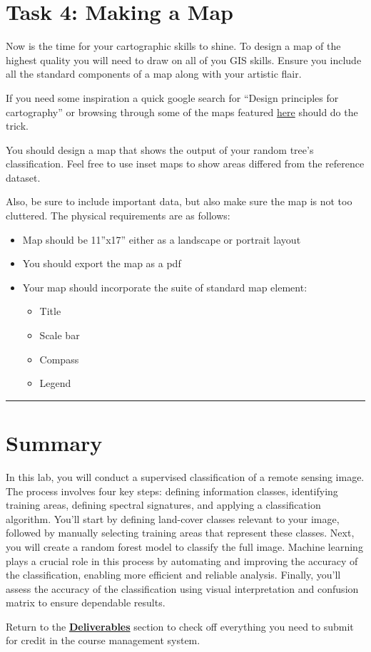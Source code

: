 \documentclass[
]{book}
\begin{document}
\hypertarget{task-4-making-a-map}{%
\section*{Task 4: Making a Map}\label{task-4-making-a-map}}

Now is the time for your cartographic skills to shine. To design a map of the highest quality you will need to draw on all of you GIS skills. Ensure you include all the standard components of a map along with your artistic flair.

If you need some inspiration a quick google search for ``Design principles for cartography'' or browsing through some of the maps featured \href{https://livingatlas.arcgis.com/en/home/}{here} should do the trick.

You should design a map that shows the output of your random tree's classification. Feel free to use inset maps to show areas differed from the reference dataset.

Also, be sure to include important data, but also make sure the map is not too cluttered.
The physical requirements are as follows:

\begin{itemize}
\item
  Map should be 11''x17'' either as a landscape or portrait layout
\item
  You should export the map as a pdf
\item
  Your map should incorporate the suite of standard map element:

  \begin{itemize}
  \item
    Title
  \item
    Scale bar
  \item
    Compass
  \item
    Legend
  \end{itemize}
\end{itemize}

\begin{center}\rule{0.5\linewidth}{0.5pt}\end{center}

\hypertarget{summary-6}{%
\section*{Summary}\label{summary-6}}

In this lab, you will conduct a supervised classification of a remote sensing image. The process involves four key steps: defining information classes, identifying training areas, defining spectral signatures, and applying a classification algorithm. You'll start by defining land-cover classes relevant to your image, followed by manually selecting training areas that represent these classes. Next, you will create a random forest model to classify the full image. Machine learning plays a crucial role in this process by automating and improving the accuracy of the classification, enabling more efficient and reliable analysis. Finally, you'll assess the accuracy of the classification using visual interpretation and confusion matrix to ensure dependable results.

Return to the \protect\hyperlink{lab8-deliverables}{\textbf{Deliverables}} section to check off everything you need to submit for credit in the course management system.
\end{document}
